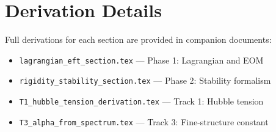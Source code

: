 \documentclass[12pt,a4paper]{article}
\begin{document}
\appendix
\section{Derivation Details}

Full derivations for each section are provided in companion documents:
\begin{itemize}
  \item \texttt{lagrangian\_eft\_section.tex} — Phase 1: Lagrangian and EOM
  \item \texttt{rigidity\_stability\_section.tex} — Phase 2: Stability formalism
  \item \texttt{T1\_hubble\_tension\_derivation.tex} — Track 1: Hubble tension
  \item \texttt{T3\_alpha\_from\_spectrum.tex} — Track 3: Fine-structure constant
\end{itemize}
\end{document}
